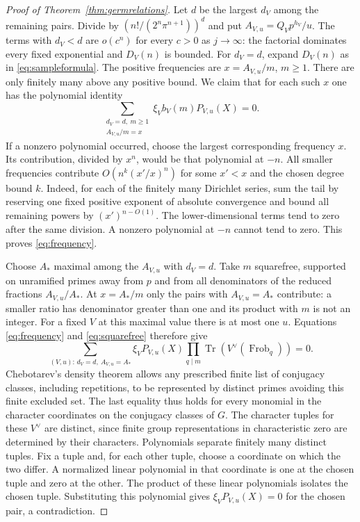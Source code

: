 \documentclass[11pt]{amsart}
\numberwithin{equation}{section}
\theoremstyle{definition}
\theoremstyle{remark}
\begin{document}
\begin{proof}[Proof of Theorem~\ref{thm:germrelations}]
Let $d$ be the largest $d_V$ among the remaining pairs. Divide
by $(n!/(2^n\pi^{n+1}))^d$ and put $A_{V,u}=Q_Vp^{h_V}/u$.
The terms with $d_V<d$ are $o(c^n)$ for every $c>0$ as
$j\to\infty$: the factorial dominates every fixed exponential and
$D_V(n)$ is bounded. For $d_V=d$, expand $D_V(n)$ as in
\eqref{eq:sampleformula}. The positive frequencies are
$x=A_{V,u}/m$, $m\ge1$. There are only finitely many above any
positive bound. We claim that for each such $x$ one has the
polynomial identity
\begin{equation}\label{eq:frequency}
 \sum_{\substack{d_V=d,\ m\ge1\\ A_{V,u}/m=x}}
      \xi_V b_V(m)P_{V,u}(X)=0 .
\end{equation}
If a nonzero polynomial occurred, choose the largest corresponding
frequency $x$. Its contribution, divided by $x^n$, would be that
polynomial at $-n$. All smaller frequencies contribute
$O(n^k(x'/x)^n)$ for some $x'<x$ and the chosen degree bound $k$.
Indeed, for each of the finitely many Dirichlet series, sum the
tail by reserving one fixed positive exponent of absolute
convergence and bound all remaining powers by $(x')^{n-O(1)}$.
The lower-dimensional terms tend to zero after the same division.
A nonzero polynomial at $-n$ cannot tend to zero. This proves
\eqref{eq:frequency}.

Choose $A_*$ maximal among the $A_{V,u}$ with $d_V=d$. Take
$m$ squarefree, supported on unramified primes away from $p$
and from all denominators of the reduced fractions $A_{V,u}/A_*$.
At $x=A_*/m$ only the pairs with $A_{V,u}=A_*$ contribute:
a smaller ratio has denominator greater than one and its product
with $m$ is not an integer. For a fixed $V$ at this maximal value
there is at most one $u$. Equations \eqref{eq:frequency} and
\eqref{eq:squarefree} therefore give
\[
 \sum_{(V,u):\,d_V=d,\ A_{V,u}=A_*}
 \xi_V P_{V,u}(X)
       \prod_{q\mid m}\operatorname{Tr}(V^\vee(\operatorname{Frob}_q))=0 .
\]
Chebotarev's density theorem
\cite[Ch.~VII, Th.~13.4]{Neukirch} allows any prescribed finite list of
conjugacy classes, including repetitions, to be represented by
distinct primes avoiding this finite excluded set. The last equality
thus holds for every monomial in the character coordinates on the
conjugacy classes of $G$. The character tuples for these $V^\vee$ are
distinct, since finite group representations in characteristic zero
are determined by their characters. Polynomials separate finitely many
distinct tuples. Fix a tuple and, for each other tuple, choose a
coordinate on which the two differ. A normalized linear polynomial
in that coordinate is one at the chosen tuple and zero at the other.
The product of these linear polynomials isolates the chosen tuple. Substituting this polynomial gives
$\xi_VP_{V,u}(X)=0$ for the chosen pair, a contradiction.


\end{proof}
\end{document}

